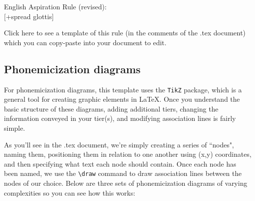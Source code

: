 \documentclass[output=paper,colorlinks,citecolor=brown,
]{langscibook}
\begin{document}
\ea \label{ex:diercks:EngAspRuleRev}
English Aspiration Rule (revised): \\ 
\phonc
{}
{[+spread glottis]}
{}
\z


Click here to see a template of this rule (in the comments of the .tex document) which you can copy-paste into your document to edit.

%
%




\subsection{Phonemicization diagrams}\label{sec:diercks:PhonDia}
For phonemicization diagrams, this template uses the \texttt{TikZ} package, which is a general tool for creating graphic elements in \LaTeX{}. Once you understand the basic structure of these diagrams, adding additional tiers, changing the information conveyed in your tier(s), and modifying association lines is fairly simple. 

 As you'll see in the .tex document, we're simply creating a series of ``nodes", naming them, positioning them in relation to one another using (x,y) coordinates, and then specifying what text each node should contain. Once each node has been named, we use the \verb|\draw| command to draw association lines between the nodes of our choice. Below are three sets of phonemicization diagrams of varying complexities so you can see how this works:

\end{document}
